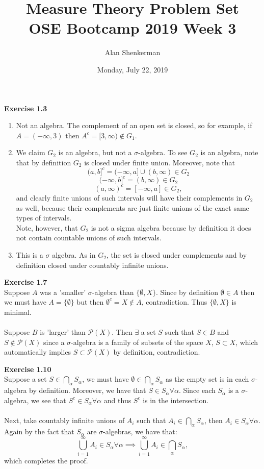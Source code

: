 \documentclass[UTF8]{article}
\begin{document}
\title{%
 \textbf{Measure Theory Problem Set}  \\
 \large OSE Bootcamp 2019 Week 3 }
\author{Alan Shenkerman } 
\date{Monday, July 22, 2019}
\maketitle

\textbf{Exercise 1.3}
\medskip
\begin{enumerate}
\item Not an algebra. The complement of an open set is closed, so for example, if $A = (-\infty, 3)$ then $A^c = [3, \infty) \notin G_1$.
\item We claim $G_2$ is an algebra, but not a $\sigma$-algebra. To see $G_2$ is an algebra, note that by definition $G_2$ is closed under finite union. Moreover, note that \\ 
$$(a,b]^c  = (-\infty, a] \cup (b, \infty)\in G_2$$ 
$$(-\infty, b]^c = (b, \infty) \in G_2$$ 
$$(a, \infty)^c = [-\infty, a] \in G_2,$$ 
and clearly finite unions of such intervals will have their complements in $G_2$ as well, because their complements are just finite unions of the exact same types of intervals. \\
Note, however, that $G_2$ is not a sigma algebra because by definition it does not contain countable unions of such intervals.
\item This is a $\sigma$ algebra. As in $G_2$, the set is closed under complements and by definition closed under countably infinite unions.
\end{enumerate}
\medskip
\textbf{Exercise 1.7} \\ 
Suppose $A$ was a 'smaller' $\sigma$-algebra than $\{\emptyset, X\}$. Since by definition $\emptyset \in A$ then we must have $A = \{\emptyset\}$ but then $\emptyset^c = X \notin A$, contradiction. Thus $\{\emptyset, X\}$ is minimal.  \\ \\
Suppose $B$ is 'larger' than $\mathcal P(X)$. Then $\exists$ a set $S$ such that $S \in B$ and $S \notin \mathcal P(X)$ since a $\sigma$-algebra is a family of subsets of the space $X$, $S \subset X$, which automatically implies $S \subset \mathcal P(X)$ by definition, contradiction. 

\medskip
\noindent \textbf{Exercise 1.10} \\ 
Suppose a set $S \in \bigcap\limits_{\alpha} S_{\alpha}$, we must have $\emptyset \in \bigcap\limits_{\alpha} S_{\alpha}$ as the empty set is in each $\sigma$-algebra by definition. Moreover, we have that $S \in S_{\alpha} \forall \alpha$. Since each $S_{\alpha}$ is a $\sigma$-algebra, we see that $S^c \in S_{\alpha} \forall \alpha$ and thus $S^c$ is in the intersection. \\ \\
Next, take countably infinite unions of $A_i$ such that $A_i \in \bigcap\limits_{\alpha} S_{\alpha}$, then $A_i \in S_{\alpha} \forall \alpha$. Again by the fact that $S_{\alpha}$ are $\sigma$-algebras, we have that:
$$\bigcup\limits_{i=1}^{\infty} A_i \in S_{\alpha} \forall \alpha \implies \bigcup\limits_{i=1}^{\infty} A_i \in \bigcap\limits_{\alpha} S_{\alpha},$$ which completes the proof.
\end{document}
